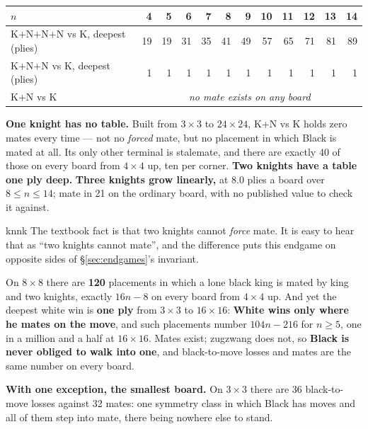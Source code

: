 \documentclass[10pt]{article}
\begin{document}
\begin{center}\small
\begin{tabular}{@{}lrrrrrrrrrrr@{}}
\toprule
$n$ & 4 & 5 & 6 & 7 & 8 & 9 & 10 & 11 & 12 & 13 & 14\\
\midrule
K$+$N$+$N$+$N vs K, deepest (plies) & 19 & 19 & 31 & 35 & 41 & 49 & 57 & 65 & 71 & 81 & 89\\
K$+$N$+$N vs K, deepest (plies)     & 1 & 1 & 1 & 1 & 1 & 1 & 1 & 1 & 1 & 1 & 1\\
K$+$N vs K                          & \multicolumn{11}{c}{\emph{no mate exists on any board}}\\
\bottomrule
\end{tabular}
\end{center}

\noindent
\textbf{One knight has no table.} Built from $3\times3$ to $24\times24$, K+N vs
K holds zero mates every time --- not no \emph{forced} mate, but no placement
in which Black is mated at all. Its only other terminal is stalemate, and there
are exactly 40 of those on every board from $4\times4$ up, ten per corner.
\textbf{Two knights have a table one ply deep.} \textbf{Three knights grow
linearly,} at $8.0$ plies a board over $8\le n\le14$; mate in 21 on the
ordinary board, with no published value to check it against.

\begin{result}[title={K + N + N vs K: mates exist; zugzwang does not}]{knnk}
The textbook fact is that two knights cannot \emph{force} mate. It is easy to
hear that as ``two knights cannot mate'', and the difference puts this endgame
on opposite sides of \S\ref{sec:endgames}'s invariant.

\smallskip
On $8\times8$ there are \textbf{120} placements in which a lone black king is
mated by king and two knights, exactly $16n-8$ on every board from $4\times4$
up. And yet the deepest white win is \textbf{one ply} from $3\times3$ to
$16\times16$: \textbf{White wins only where he mates on the move}, and such
placements number $104n-216$ for $n\ge5$, one in a million and a half at
$16\times16$. Mates exist; zugzwang does not, so \textbf{Black is never obliged
to walk into one}, and black-to-move losses and mates are the same number on
every board.

\smallskip
\textbf{With one exception, the smallest board.} On $3\times3$ there are 36
black-to-move losses against 32 mates: one symmetry class in which Black has
moves and all of them step into mate, there being nowhere else to stand.
\label{sub:kn-claim}
\end{result}
\end{document}

